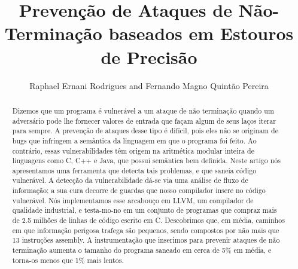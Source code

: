 \documentclass{llncs}
\begin{document}
\title{Prevenção de Ataques de Não-Terminação baseados em
Estouros de Precisão}

\author{Raphael Ernani Rodrigues and Fernando Magno Quintão Pereira}



\maketitle

\addtolength{\parskip}{-3mm}
\begin{abstract}
Dizemos que um programa é vulnerável a um ataque de não terminação quando
um adversário pode lhe fornecer valores de entrada que façam algum de seus laços 
iterar para sempre.
A prevenção de ataques desse tipo é difícil, pois eles não se originam de bugs 
que infringem a semântica da linguagem em que o programa foi feito.
Ao contrário, essas vulnerabilidades têm origem na aritmética modular inteira de 
linguagens como C, C++ e Java, que possui semântica bem definida.
Neste artigo nós apresentamos uma ferramenta que detecta tais problemas, 
e que saneia código vulnerável.
A detecção da vulnerabilidade dá-se via uma análise de fluxo de informação;
a sua cura decorre de guardas que nosso compilador insere no código vulnerável.
Nós implementamos esse arcabouço em LLVM, um compilador de qualidade industrial, 
e testa-mo-no em um conjunto de programas que compraz mais de
2.5 milhões de linhas de código escrito em C.
Descobrimos que, em média, caminhos em que informação perigosa trafega são 
pequenos, sendo compostos por não mais que 13 instruções assembly.
A instrumentação que inserimos para prevenir ataques de não terminação aumenta o 
tamanho do programa saneado em cerca de 5\% em média, e torna-os menos que 1\% 
mais lentos.
\end{abstract}
\end{document}
